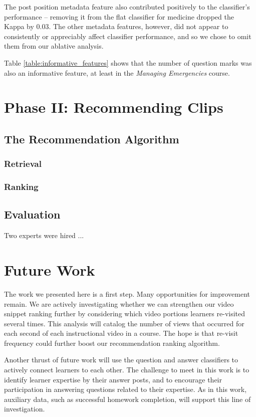 \documentclass{edm_template}
\begin{document}
The post position metadata feature also contributed positively to the classifier's performance -- removing it from the flat classifier for medicine dropped the Kappa by 0.03. The other metadata features, however, did not appear to consistently or appreciably affect classifier performance, and so we chose to omit them from our ablative analysis.

Table \ref{table:informative_features} shows that the number of question marks was also an informative feature, at least in the \emph{Managing Emergencies} course. 

\section{Phase II: Recommending Clips}
\label{sec:clipRecommendation}
\subsection{The Recommendation Algorithm}
\subsubsection{Retrieval}
\subsubsection{Ranking}

\subsection{Evaluation}
Two experts were hired ...

\section{Future Work}
\label{sec:futureWork}

The work we presented here is a first step. Many opportunities for
improvement remain. We are actively investigating whether we can
strengthen our video snippet ranking further by considering which
video portions learners re-visited several times. This analysis will
catalog the number of views that occurred for each second of each
instructional video in a course. The hope is that re-visit frequency
could further boost our recommendation ranking algorithm.

Another thrust of future work will use the question and answer
classifiers to actively connect learners to each other. The challenge
to meet in this work is to identify learner expertise by their answer
posts, and to encourage their participation in answering questions
related to their expertise. As in this work, auxiliary data, such as
successful homework completion, will support this line of
investigation.
\end{document}
